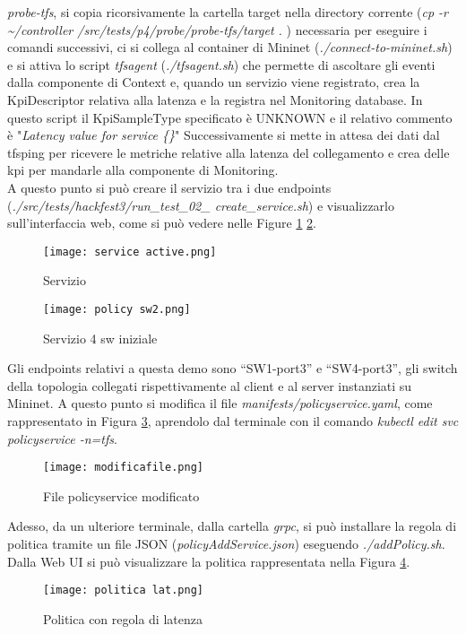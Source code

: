 \textit{probe-tfs}, si copia ricorsivamente la cartella target nella directory corrente (\textit{cp -r \textasciitilde /controller /src/tests/p4/probe/probe-tfs/target . })
necessaria per eseguire i comandi successivi,
ci si collega al container di Mininet (\textit{./connect-to-mininet.sh}) e
si attiva lo script \textit{tfsagent} (\textit{./tfsagent.sh}) che permette di ascoltare gli eventi dalla componente di Context e, 
quando un servizio viene registrato, crea la KpiDescriptor relativa alla latenza e la registra nel Monitoring database.
In questo script il KpiSampleType specificato è UNKNOWN e il relativo commento è "\textit{Latency value for service \{\}}"
Successivamente si mette in attesa dei dati dal tfsping per ricevere le metriche relative alla latenza del collegamento e crea delle kpi per mandarle alla componente di Monitoring.
\\A questo punto si può creare il servizio tra i due endpoints (\textit{./src/tests/hackfest3/run\_test\_02\_ create\_service.sh}) e visualizzarlo sull'interfaccia web, come si può vedere nelle Figure \ref{fig:ser} \ref{fig:sw4}.
\begin{figure}[h]
    \centering
    \texttt{[image: service active.png]}
    \caption{Servizio}
    \label{fig:ser}
\end{figure}
\begin{figure}[h]
    \centering
    \texttt{[image: policy sw2.png]}
    \caption{Servizio 4 sw iniziale}
    \label{fig:sw4}
\end{figure}
Gli endpoints relativi a questa demo sono “SW1-port3” e “SW4-port3”, 
gli switch della topologia collegati rispettivamente al client e al server instanziati su Mininet.
A questo punto si modifica il file \textit{manifests/policyservice.yaml}, come rappresentato in Figura \ref{fig:pol}, aprendolo dal terminale con il comando \textit{kubectl edit svc policyservice -n=tfs}.
\begin{figure}[h]
    \centering
    \texttt{[image: modificafile.png]}
    \caption{File policyservice modificato}
    \label{fig:pol}
\end{figure}
Adesso, da un ulteriore terminale, dalla cartella \textit{grpc}, si può installare la regola di politica tramite un file JSON (\textit{policyAddService.json}) eseguendo \textit{./addPolicy.sh}.
Dalla Web UI si può visualizzare la politica rappresentata nella Figura \ref{fig:lat}.
\begin{figure}[h]
    \centering
    \texttt{[image: politica lat.png]}
    \caption{Politica con regola di latenza}
    \label{fig:lat}
\end{figure}
